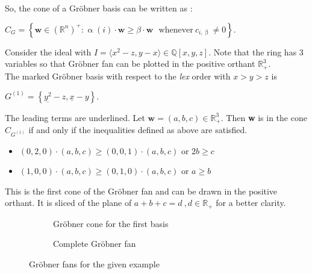 So, the cone of a Gröbner basis can be written as : \cite{coxOshea}\\
\begin{center}
$C_{G} = \left\lbrace \textbf{w} \in \left(\mathbb{R}^{n}\right)^{+} : \upalpha\left( i\right) \cdot \textbf{w} \geq \beta \cdot \textbf{w}~~~ \textrm{whenever}~ c_{i,\upbeta} \neq 0 \right\rbrace   .$
\end{center}


\begin{env_example}\normalfont
\label{ex:groebnerfan}
Consider the ideal with $ I = \langle x^{2}-z,y-x \rangle \in \mathbb{Q}\left[ x,y,z\right] .$
Note that the ring has 3 variables so that Gröbner fan can be plotted in the positive orthant $ \mathbb{R}^{3}_{+}$. \\
The marked Gröbner basis with respect to the \textit{lex} order with $x>y>z$ is
\begin{center}
$G^{\left( 1\right) } = \left\lbrace \underline{y^{2}}-z,\underline{x} -y\right\rbrace .$
\end{center}
The leading terms are underlined. Let $\textbf{w} = \left( a,b,c\right) \in \mathbb{R}^{3}_{+} $. Then \textbf{w} is in the cone $C_{G^{(1)}}$ if and only if the inequalities defined as above are satisfied.

\begin{itemize}

\item
$\left( 0,2,0\right) \cdot \left( a,b,c\right) \geq \left( 0,0,1\right) \cdot \left( a,b,c\right) $ or $2b\geq c$ 
\item
$\left( 1,0,0\right) \cdot \left( a,b,c\right) \geq \left( 0,1,0\right) \cdot \left( a,b,c\right) $ or $a\geq b$ 

\end{itemize} 

This is the first cone of the Gröbner fan and can be drawn in the positive orthant. It is sliced of the plane of $a+b+c=d~,d\in \mathbb{R}_+$ for a better clarity.


\begin{figure}
    \centering
    \begin{subfigure}[b]{0.48\linewidth}        %
        \centering
        
        \caption{Gröbner cone for the first basis}
        \label{fig:singlegroebner}
    \end{subfigure}
    \begin{subfigure}[b]{0.48\linewidth}        %
        \centering
        
        \caption{Complete Gröbner fan}
        \label{fig:completegroebner}
    \end{subfigure}
    \caption{Gröbner fans for the given example}
    \label{fig:groebnerfans}
\end{figure}





\end{env_example}
